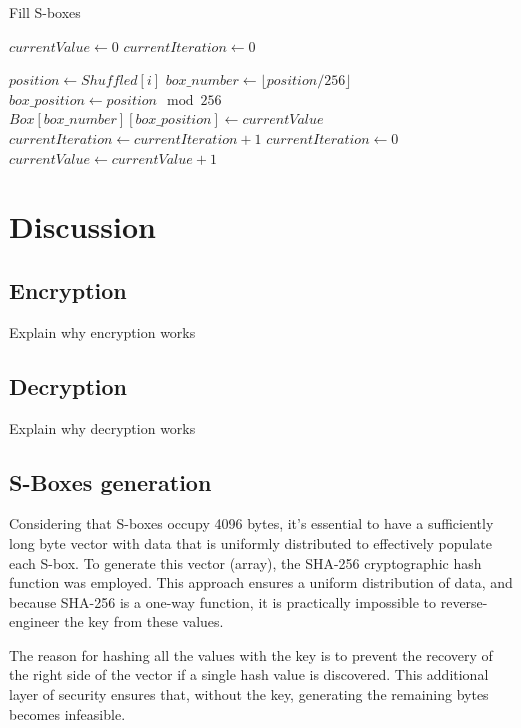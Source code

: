 \documentclass{article} %
\begin{document}
\begin{algorithm}[H]
  \caption{Fill S-boxes}
  \begin{algorithmic}[1]

    \State $currentValue \gets 0$
    \State $currentIteration \gets 0$

      \State $position \gets Shuffled[i]$
      \State $box\_number \gets \lfloor position / 256 \rfloor$
      \State $box\_position \gets position \mod 256$
      \State $Box[box\_number][box\_position] \gets currentValue$
      \State $currentIteration \gets currentIteration + 1$
          \State $currentIteration \gets 0$
          \State $currentValue \gets currentValue + 1$
      \EndIf
    \EndFor

  \end{algorithmic}
\end{algorithm} 

\section {Discussion}

\subsection{Encryption}
Explain why encryption works

\subsection{Decryption}
Explain why decryption works

\subsection{S-Boxes generation}

Considering that S-boxes occupy 4096 bytes, it's essential to have a sufficiently long byte vector with data that is uniformly distributed to effectively populate each S-box. To generate this vector (array), the SHA-256 cryptographic hash function was employed. This approach ensures a uniform distribution of data, and because SHA-256 is a one-way function, it is practically impossible to reverse-engineer the key from these values.

The reason for hashing all the values with the key is to prevent the recovery of the right side of the vector if a single hash value is discovered. This additional layer of security ensures that, without the key, generating the remaining bytes becomes infeasible.
\end{document}
